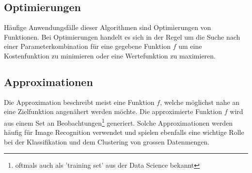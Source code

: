 \cite[Kap. 1.2]{Bro11}

\subsection{Optimierungen}
Häufige Anwendungsfälle dieser Algorithmen sind Optimierungen von Funktionen. Bei Optimierungen
handelt es sich in der Regel um die Suche nach einer Parameterkombination für eine gegebene Funktion $f$ um eine
Kostenfunktion zu minimieren oder eine Wertefunktion zu maximieren.

\subsection{Approximationen}
Die Approximation beschreibt meist eine Funktion $f$, welche möglichst nahe an eine Zielfunktion angenähert werden
möchte. Die approximierte Funktion $f$ wird aus einem Set an Beobachtungen\footnote{oftmals auch als 'training set' aus
der Data Science bekannt} generiert. Solche Approximationen werden häufig für Image Recognition verwendet
und spielen ebenfalls eine wichtige Rolle bei der Klassifikation und dem Clustering von grossen Datenmengen.